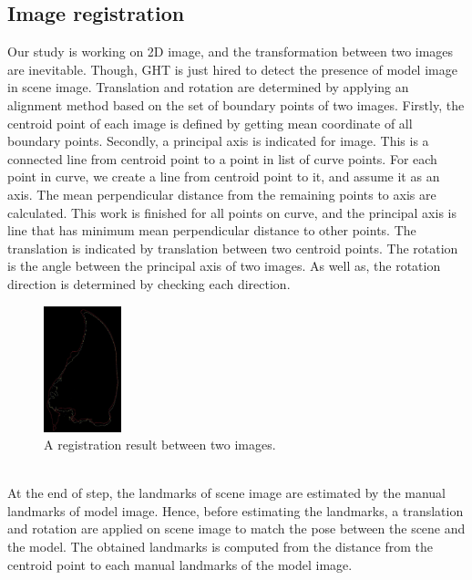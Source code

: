 \documentclass[twoside,twocolumn,10pt]{article}
\begin{document}
\subsection{Image registration}
Our study is working on 2D image, and the transformation between two images are inevitable. Though, GHT is just hired to detect the presence of model image in scene image. Translation and rotation are determined by applying an alignment method based on the set of boundary points of two images. Firstly, the centroid point of each image is defined by getting mean coordinate of all boundary points. Secondly, a principal axis is indicated for image. This is a connected line from centroid point to a point in list of curve points. For each point in curve, we create a line from centroid point to it, and assume it as an axis. The mean perpendicular distance from the remaining points to axis are calculated. This work is finished for all points on curve, and the principal axis is line that has minimum mean perpendicular distance to other points. The translation is indicated by translation between two centroid points. The rotation is the angle between the principal axis of two images. As well as, the rotation direction is determined by checking each direction.
\begin{figure}[htb]
    \centering
    \includegraphics[width=0.2\textwidth]{./images/imreg}
    \caption{A registration result between two images.}
    \label{fig:box}
\end{figure}~\\
At the end of step, the landmarks of scene image are estimated by the manual landmarks of model image. Hence, before estimating the landmarks, a translation and rotation are applied on scene image to match the pose between the scene and the model. The obtained landmarks is computed from the distance from the centroid point to each manual landmarks of the model image.
\end{document}
